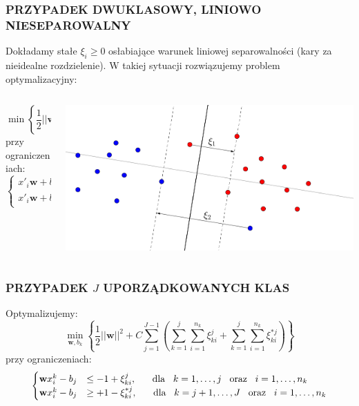 \documentclass[11pt,usenames,dvipsnames,svgnames,x11names]{beamer}
\theoremstyle{plain}
\theoremstyle{definition}
\theoremstyle{remark}
\begin{document}
\begin{frame}
\frametitle{\small PRZYPADEK DWUKLASOWY, LINIOWO NIESEPAROWALNY}
Dokładamy stałe $\xi_i\geq 0$ osłabiające warunek liniowej separowalności (kary za nieidealne rozdzielenie). W takiej sytuacji rozwiązujemy problem optymalizacyjny:
\begin{columns}
\begin{column}[t]{0.35\textwidth}
$$
\min\left\lbrace\dfrac{1}{2}||\textbf{w}||^2+C\sum_{i=1}^{n}\xi_i\right\rbrace
$$
przy ograniczeniach:
$$
\begin{cases}
x'_i\textbf{w}+b &\geq 1-\xi_i\\
x'_i\textbf{w}+b &\leq -1+\xi_i
\end{cases}
$$
\end{column}
\begin{column}[t]{0.65\textwidth}
\begin{center}
\includegraphics[width=\textwidth]{svm2.png}
\end{center}
\end{column}
\end{columns}

\end{frame}


\begin{frame}
\frametitle{\small PRZYPADEK $J$ UPORZĄDKOWANYCH KLAS}
Optymalizujemy:
$$
\min_{\textbf{w}, b_k}\left\lbrace \dfrac{1}{2}||\textbf{w}||^2+C\sum_{j=1}^{J-1}\left( \sum_{k=1}^{j}\sum_{i=1}^{n_k}\xi_{ki}^j+\sum_{k=1}^{j}\sum_{i=1}^{n_k}\xi_{ki}^{*j}\right)\right\rbrace
$$
przy ograniczeniach:
$$
\begin{cases}
\textbf{w}x_i^k-b_j&\leq -1 +\xi^j_{ki}, \hspace{6mm} \textrm{dla}\hspace{3mm} k=1,\ldots,j \hspace{3mm}\textrm{oraz}\hspace{3mm} i=1,\ldots,n_k \\
\textbf{w}x_i^k-b_j&\geq +1 -\xi^{*j}_{ki}, \hspace{6mm} \textrm{dla}\hspace{3mm} k=j+1,\ldots,J \hspace{3mm}\textrm{oraz}\hspace{3mm} i=1,\ldots,n_k 
\end{cases}
$$
\end{frame}
\end{document}
